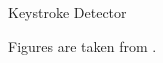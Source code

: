 \documentclass[ucs,9pt,usenames,dvipsnames]{beamer}
\begin{document}
\begin{frame}{Keystroke Detector}
\begin{minipage}[c]{0.49\linewidth}
		
	\end{minipage}	
\centering \tiny
Figures are taken from \cite{b1}.
\end{frame}
\end{document}
